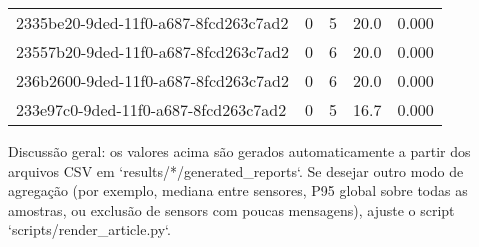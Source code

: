 \begin{longtable}{l r r r r}
2335be20-9ded-11f0-a687-8fcd263c7ad2 & 0 & 5 & 20.0 & 0.000 \\

23557b20-9ded-11f0-a687-8fcd263c7ad2 & 0 & 6 & 20.0 & 0.000 \\

236b2600-9ded-11f0-a687-8fcd263c7ad2 & 0 & 6 & 20.0 & 0.000 \\

233e97c0-9ded-11f0-a687-8fcd263c7ad2 & 0 & 5 & 16.7 & 0.000 \\

\end{longtable}




Discussão geral: os valores acima são gerados automaticamente a partir dos arquivos CSV em `results/*/generated_reports`. Se desejar outro modo de agregação (por exemplo, mediana entre sensores, P95 global sobre todas as amostras, ou exclusão de sensors com poucas mensagens), ajuste o script `scripts/render_article.py`.